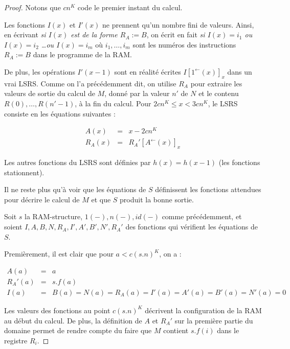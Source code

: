 \documentclass{report}
\newcommand{\eqpred}[3]{#1\left[ #2^{\leftarrow}(#3) \right]_{#3}}
\begin{document}
\begin{proof}
{\begin{minipage}{0.9\textwidth}
				\end{minipage}
				}
			
			\espace 
			
			Notons que $cn^K$ code le premier instant du calcul. 
			
			Les fonctions $I(x)$ et $I'(x)$ ne prennent qu'un nombre fini de valeurs. Ainsi, en écrivant \emph{si $I(x)$ est de la forme $R_A := B$}, on écrit en fait \emph{si $I(x) = i_1$ ou $I(x) = i_2$ \dots ou $I(x) = i_m$} où $i_1, \dots, i_m$ sont les numéros des instructions $R_A := B$ dans le programme de la RAM.
			
			De plus, les opérations $I'(x-1)$ sont en réalité écrites $\eqpred{I}{1}{x}$ dans un vrai LSRS. Comme on l'a précédemment dit, on utilise $R_A$ pour extraire les valeurs de sortie du calcul de $M$, donné par la valeur $n'$ de $N$ et le contenu $R(0), \dots, R(n'-1)$, à la fin du calcul. Pour $2cn^K \leqslant x < 3cn^K$, le LSRS consiste en les équations suivantes :
			
			\setcounter{equation}{0}
			\begin{eqnarray}
				A(x) & = & x - 2cn^K \\
				R_A(x) & = & \eqpred{R_A'}{A}{x}
			\end{eqnarray}
			
			Les autres fonctions du LSRS sont définies par $h(x) = h(x-1)$ (les fonctions stationnent).
			
			Il ne reste plus qu'à voir que les équations de $S$ définissent les fonctions attendues pour décrire le calcul de $M$ et que $S$ produit la bonne sortie.
			
			Soit $s$ la RAM-structure, $1(-), n(-), id(-)$ \footnotemark comme précédemment, et soient $I, A, B, N, R_A, I', A', B', N', R_A'$ des fonctions qui vérifient les équations de $S$.
				
			Premièrement, il est clair que pour $a < c(s.n)^K$, on a :
			
			\setcounter{equation}{0}
			\begin{eqnarray}
				A(a) & = & a \\
				R_A'(a) & = & s.f(a) \\
				I(a) & = & B(a) = N(a) = R_A(a) = I'(a) = A'(a) = B'(a) = N'(a) = 0
			\end{eqnarray}
			
			Les valeurs des fonctions au point $c(s.n)^K$ décrivent la configuration de la RAM au début du calcul. De plus, la définition de $A$ et $R_A'$ sur la première partie du domaine permet de rendre compte du faire que $M$ contient $s.f(i)$ dans le registre $R_i$.
			

\end{proof}
\end{document}
